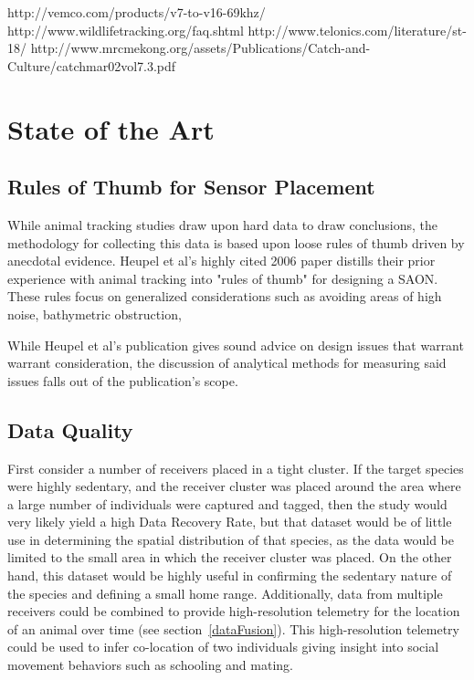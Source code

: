 http://vemco.com/products/v7-to-v16-69khz/
http://www.wildlifetracking.org/faq.shtml
http://www.telonics.com/literature/st-18/
http://www.mrcmekong.org/assets/Publications/Catch-and-Culture/catchmar02vol7.3.pdf










\section{State of the Art}

\subsection{Rules of Thumb for Sensor Placement}
\label{RulesOfThumb}
While animal tracking studies draw upon hard data to draw conclusions, the methodology for collecting this data is based upon loose rules of thumb driven by anecdotal evidence.  Heupel et al's highly cited 2006 paper distills their prior experience with animal tracking into "rules of thumb" for designing a SAON.  These rules focus on generalized considerations such as avoiding areas of high noise, bathymetric obstruction, 

While Heupel et al's publication gives sound advice on design issues that warrant warrant consideration, the discussion of analytical methods for measuring said issues falls out of the publication's scope.

\subsection{Data Quality}
\label{dataQuality}
First consider a number of receivers placed in a tight cluster.
If the target species were highly sedentary, and the receiver cluster was placed around the area where a large number of individuals were captured and tagged, then the study would very likely yield a high Data Recovery Rate, but that dataset would be of little use in determining the spatial distribution of that species, as the data would be limited to the small area in which the receiver cluster was placed.  On the other hand, this dataset would be highly useful in confirming the sedentary nature of the species and defining a small home range.  Additionally, data from multiple receivers could be combined to provide high-resolution telemetry for the location of an animal over time (see section~\ref{dataFusion}).  This high-resolution telemetry could be used to infer co-location of two individuals giving insight into social movement behaviors such as schooling and mating.  


